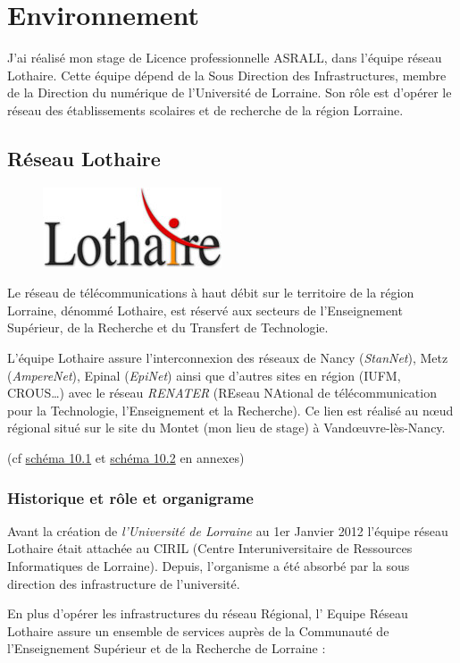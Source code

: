 \documentclass[a4paper,12pt,one side,titlepage]{report}
\begin{document}
\chapter{Environnement}
J'ai réalisé mon stage de Licence professionnelle ASRALL, dans l'équipe réseau Lothaire.
Cette équipe dépend de la Sous Direction des Infrastructures, membre de la Direction 
du numérique de l'Université de Lorraine. Son rôle est d'opérer le réseau des 
établissements scolaires et de recherche de la région Lorraine.
\section{Réseau Lothaire}
\begin{figure}[H]
\center
\includegraphics{lothaire.jpg}
\end{figure}
Le réseau de télécommunications à haut débit sur le territoire de la région Lorraine, 
dénommé Lothaire, est réservé aux secteurs de l’Enseignement Supérieur, de la Recherche 
et du Transfert de Technologie. 

L'équipe Lothaire assure l’interconnexion des réseaux de Nancy (\emph{StanNet}), 
Metz (\emph{AmpereNet}), Epinal (\emph{EpiNet}) ainsi que d'autres sites en région 
(IUFM, CROUS\ldots) avec le réseau \emph{RENATER} (REseau NAtional de télécommunication 
pour la Technologie, l'Enseignement et la Recherche). Ce lien est réalisé au nœud 
régional situé sur le site du Montet (mon lieu de stage) à Vandœuvre-lès-Nancy.

(cf \hyperref[fig:imagereseaulothaire1]{schéma 10.1}  et \hyperref[fig:imagereseaulothaire1]{schéma 10.2} 
en annexes)

\subsection{Historique et rôle et organigrame}

Avant la création de \emph{l'Université de Lorraine} au 1er Janvier 2012 l'équipe 
réseau Lothaire était attachée au CIRIL (Centre Interuniversitaire de Ressources Informatiques
de Lorraine). Depuis, l'organisme a été absorbé par la sous direction des infrastructure
de l'université.

En plus d’opérer les infrastructures du réseau Régional, l’ Equipe Réseau Lothaire 
assure un ensemble de services auprès de la Communauté de l’Enseignement Supérieur 
et de la Recherche de Lorraine :
\end{document}
